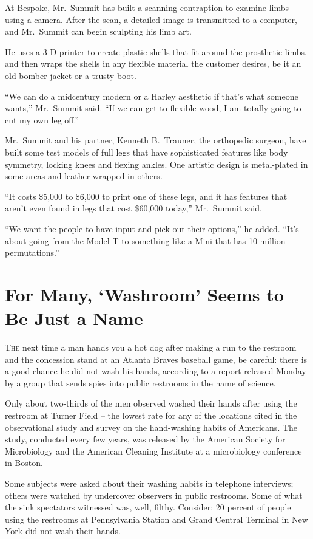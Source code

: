 ﻿\documentclass[12pt]{article}
\begin{document}
At Bespoke, Mr.~Summit has built a scanning contraption to examine limbs using a camera. After the
scan, a detailed image is transmitted to a computer, and Mr.~Summit can begin sculpting his limb
art.

He uses a 3-D printer to create plastic shells that fit around the prosthetic limbs, and then wraps
the shells in any flexible material the customer desires, be it an old bomber jacket or a trusty
boot.

``We can do a midcentury modern or a Harley aesthetic if that's what someone wants,'' Mr.~Summit
said. ``If we can get to flexible wood, I am totally going to cut my own leg off.''

Mr.~Summit and his partner, Kenneth B.~Trauner, the orthopedic surgeon, have built some test models
of full legs that have sophisticated features like body symmetry, locking knees and flexing ankles.
One artistic design is metal-plated in some areas and leather-wrapped in others.

``It costs \$5,000 to \$6,000 to print one of these legs, and it has features that aren't even found
in legs that cost \$60,000 today,'' Mr.~Summit said.

``We want the people to have input and pick out their options,'' he added. ``It's about going from
the Model T to something like a Mini that has 10 million permutations.''

\pagebreak
\section{For Many, `Washroom' Seems to Be Just a Name}

\lettrine{T}{he} next time a man hands you a hot dog after making a run to
the restroom and the concession stand at an Atlanta Braves baseball game, be careful: there is a
good chance he did not wash his hands, according to a report released Monday by a group that sends
spies into public restrooms in the name of science.

Only about two-thirds of the men observed washed their hands after using the restroom at Turner
Field -- the lowest rate for any of the locations cited in the observational study and survey on the
hand-washing habits of Americans. The study, conducted every few years, was released by the American
Society for Microbiology and the American Cleaning Institute at a microbiology conference in Boston.

Some subjects were asked about their washing habits in telephone interviews; others were watched by
undercover observers in public restrooms. Some of what the sink spectators witnessed was, well,
filthy. Consider: 20 percent of people using the restrooms at Pennsylvania Station and Grand Central
Terminal in New York did not wash their hands.
\end{document}
